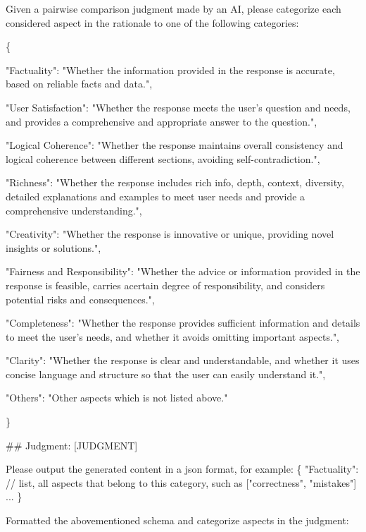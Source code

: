 \documentclass{article} %
\begin{document}
\begin{tcolorbox}[breakable, title=Judgment Dimension Categorization Prompt, label=test]
\small
\ttfamily
Given a pairwise comparison judgment made by an AI, please categorize each considered aspect in the rationale to one of the following categories:

\vspace{4mm}
\{
    
    \vspace{2mm}
    "Factuality": "Whether the information provided in the response is accurate, based on reliable facts and data.",

    \vspace{2mm}
    "User Satisfaction": "Whether the response meets the user's question and needs, and provides a comprehensive and appropriate answer to the question.",

    \vspace{2mm}
    "Logical Coherence": "Whether the response maintains overall consistency and logical coherence between different sections, avoiding self-contradiction.",

    \vspace{2mm}
    "Richness": "Whether the response includes rich info, depth, context, diversity, detailed explanations and examples to meet user needs and provide a comprehensive understanding.",

    \vspace{2mm}
    "Creativity": "Whether the response is innovative or unique, providing novel insights or solutions.",

    \vspace{2mm}
    "Fairness and Responsibility": "Whether the advice or information provided in the response is feasible, carries acertain degree of responsibility, and considers potential risks and consequences.",

    \vspace{2mm}
    "Completeness": "Whether the response provides sufficient information and details to meet the user's needs, and whether it avoids omitting important aspects.",

    \vspace{2mm}
    "Clarity": "Whether the response is clear and understandable, and whether it uses concise language and structure so that the user can easily understand it.",

    \vspace{2mm}
    "Others": "Other aspects which is not listed above."

\}

\vspace{4mm}
\#\# Judgment: [JUDGMENT]

\vspace{4mm}
Please output the generated content in a json format, for example:
\{
"Factuality": // list, all aspects that belong to this category, such as ["correctness", "mistakes"]
...
\}

\vspace{4mm}
Formatted the abovementioned schema and categorize aspects in the judgment:


\end{tcolorbox}
\label{}
\end{document}
